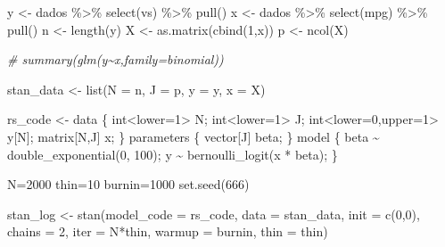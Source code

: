 \documentclass[
]{book}
\newenvironment{Shaded}{\begin{snugshade}}{\end{snugshade}}
\newcommand{\AttributeTok}[1]{\textcolor[rgb]{0.77,0.63,0.00}{#1}}
\newcommand{\CommentTok}[1]{\textcolor[rgb]{0.56,0.35,0.01}{\textit{#1}}}
\newcommand{\DecValTok}[1]{\textcolor[rgb]{0.00,0.00,0.81}{#1}}
\newcommand{\FunctionTok}[1]{\textcolor[rgb]{0.00,0.00,0.00}{#1}}
\newcommand{\NormalTok}[1]{#1}
\newcommand{\OtherTok}[1]{\textcolor[rgb]{0.56,0.35,0.01}{#1}}
\newcommand{\SpecialCharTok}[1]{\textcolor[rgb]{0.00,0.00,0.00}{#1}}
\newcommand{\StringTok}[1]{\textcolor[rgb]{0.31,0.60,0.02}{#1}}
\begin{document}
\begin{Shaded}
\begin{Highlighting}[]
\NormalTok{y }\OtherTok{\textless{}{-}}\NormalTok{ dados }\SpecialCharTok{\%\textgreater{}\%} \FunctionTok{select}\NormalTok{(vs) }\SpecialCharTok{\%\textgreater{}\%} \FunctionTok{pull}\NormalTok{()}
\NormalTok{x }\OtherTok{\textless{}{-}}\NormalTok{ dados }\SpecialCharTok{\%\textgreater{}\%} \FunctionTok{select}\NormalTok{(mpg) }\SpecialCharTok{\%\textgreater{}\%} \FunctionTok{pull}\NormalTok{()}
\NormalTok{n }\OtherTok{\textless{}{-}} \FunctionTok{length}\NormalTok{(y)}
\NormalTok{X }\OtherTok{\textless{}{-}} \FunctionTok{as.matrix}\NormalTok{(}\FunctionTok{cbind}\NormalTok{(}\DecValTok{1}\NormalTok{,x))}
\NormalTok{p }\OtherTok{\textless{}{-}} \FunctionTok{ncol}\NormalTok{(X)}

\CommentTok{\# summary(glm(y\textasciitilde{}x,family=binomial))}

\NormalTok{stan\_data }\OtherTok{\textless{}{-}} \FunctionTok{list}\NormalTok{(}\AttributeTok{N =}\NormalTok{ n, }\AttributeTok{J =}\NormalTok{ p, }\AttributeTok{y =}\NormalTok{ y, }\AttributeTok{x =}\NormalTok{ X)}

\NormalTok{rs\_code }\OtherTok{\textless{}{-}} \StringTok{\textquotesingle{}}
\StringTok{  data \{}
\StringTok{    int\textless{}lower=1\textgreater{} N;}
\StringTok{    int\textless{}lower=1\textgreater{} J;}
\StringTok{    int\textless{}lower=0,upper=1\textgreater{} y[N];}
\StringTok{    matrix[N,J] x;}
\StringTok{  \}}
\StringTok{  parameters \{}
\StringTok{    vector[J] beta;}
\StringTok{  \}}
\StringTok{  model \{}
\StringTok{    beta \textasciitilde{} double\_exponential(0, 100);}
\StringTok{    y \textasciitilde{} bernoulli\_logit(x * beta);}
\StringTok{  \}\textquotesingle{}}

\NormalTok{N}\OtherTok{=}\DecValTok{2000}
\NormalTok{thin}\OtherTok{=}\DecValTok{10}
\NormalTok{burnin}\OtherTok{=}\DecValTok{1000}
\FunctionTok{set.seed}\NormalTok{(}\DecValTok{666}\NormalTok{)}

\NormalTok{stan\_log }\OtherTok{\textless{}{-}} \FunctionTok{stan}\NormalTok{(}\AttributeTok{model\_code =}\NormalTok{ rs\_code, }\AttributeTok{data =}\NormalTok{ stan\_data, }\AttributeTok{init =} \FunctionTok{c}\NormalTok{(}\DecValTok{0}\NormalTok{,}\DecValTok{0}\NormalTok{),}
  \AttributeTok{chains =} \DecValTok{2}\NormalTok{, }\AttributeTok{iter =}\NormalTok{ N}\SpecialCharTok{*}\NormalTok{thin, }\AttributeTok{warmup =}\NormalTok{ burnin, }\AttributeTok{thin =}\NormalTok{ thin)}
\end{Highlighting}
\end{Shaded}
\end{document}
